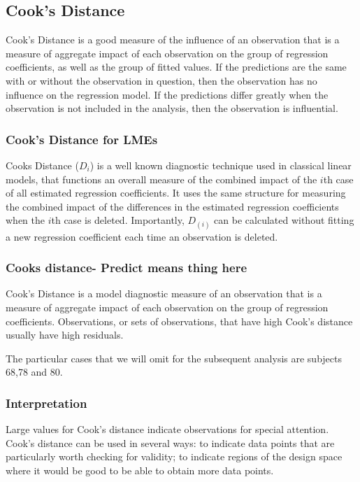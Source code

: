 \documentclass[12pt, a4paper]{report}
\theoremstyle{plain}
\theoremstyle{definition}
\theoremstyle{remark}
\begin{document}
	\subsection{Cook's Distance}
	
	Cook's Distance is a good measure of the influence of an observation that is a measure of aggregate impact of each observation on the group of regression coefficients, as well as the group of fitted values.
	If the predictions are the same with or without the observation in question, then the observation has no influence on the regression model. If the predictions differ greatly when the observation is not included in the analysis, then the observation is influential.
	
	
\subsubsection{Cook's Distance for LMEs} %
	
 Cooks Distance ($D_{i}$) is a well known diagnostic technique used in classical linear models, that functions an overall measure of the combined impact of the $i$th case of all estimated regression coefficients. It uses the same structure for measuring the combined impact of the differences in the estimated regression coefficients when the $i$th case is deleted. Importantly, $D_{(i)}$ can be calculated without fitting a new regression coefficient each time an observation is deleted.
	
\subsubsection{Cooks distance- Predict means thing here}
Cook's Distance is a model diagnostic measure of an observation that is a measure of aggregate impact of each observation on the group of regression coefficients. Observations, or sets of observations, that have high Cook's distance usually have high residuals.
	
The particular cases that we will omit for the subsequent analysis are subjects 68,78 and 80.
	
\subsubsection{Interpretation}
Large values for Cook's distance indicate observations for special attention. Cook's distance can be used in several ways: to indicate data points that are particularly worth checking for validity; to indicate regions of the design space where it would be good to be able to obtain more data points.
	
\end{document}
